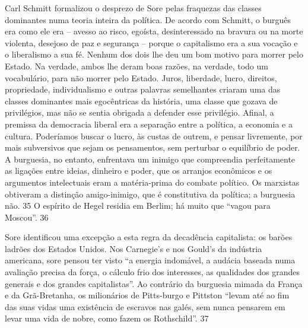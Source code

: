 Carl Schmitt formalizou o desprezo de Sore pelas fraquezas das classes dominantes numa teoria inteira da política. De acordo com Schmitt, o burguês era como ele era – avesso ao risco, egoísta, desinteressado na bravura ou na morte violenta, desejoso de paz e segurança – porque o capitalismo era a sua vocação e o liberalismo a sua fé. Nenhum dos dois lhe deu um bom motivo para morrer pelo Estado. Na verdade, ambos lhe deram boas razões, na verdade, todo um vocabulário, para não morrer pelo Estado. Juros, liberdade, lucro, direitos, propriedade, individualismo e outras palavras semelhantes criaram uma das classes dominantes mais egocêntricas da história, uma classe que gozava de privilégios, mas não se sentia obrigada a defender esse privilégio. Afinal, a premissa da democracia liberal era a separação entre a política, a economia e a cultura. Poderíamos buscar o lucro, às custas de outrem, e pensar livremente, por mais subversivos que sejam os pensamentos, sem perturbar o equilíbrio de poder. A burguesia, no entanto, enfrentava um inimigo que compreendia perfeitamente as ligações entre ideias, dinheiro e poder, que os arranjos econômicos e os argumentos intelectuais eram a matéria-prima do combate político. Os marxistas obtiveram a distinção amigo-inimigo, que é constitutiva da política; a burguesia não.
 {\color{blue} 35}  
O espírito de Hegel residia em Berlim; há muito que “vagou para Moscou”.
 {\color{blue} 36}  

 
\par
 
Sore identificou uma excepção a esta regra da decadência capitalista: os barões ladrões dos Estados Unidos. Nos Carnegie's e nos Gould's da indústria americana, sore pensou ter visto “a energia indomável, a audácia baseada numa avaliação precisa da força, o cálculo frio dos interesses, as qualidades dos grandes generais e dos grandes capitalistas”. Ao contrário da burguesia mimada da França e da Grã-Bretanha, os milionários de Pitts-burgo e Pittston “levam até ao fim das suas vidas uma existência de escravos nas galés, sem nunca pensarem em levar uma vida de nobre, como fazem os Rothschild”.
 {\color{blue} 37}  

 
\par
 
